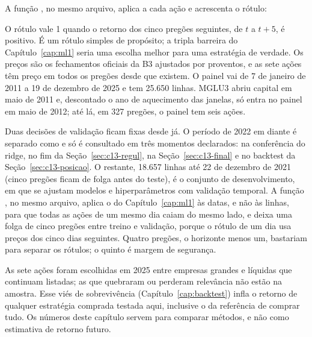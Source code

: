 A função , no mesmo arquivo, aplica  a cada ação e acrescenta o rótulo:



O rótulo  vale 1 quando o retorno dos cinco pregões seguintes, de $t$ a $t+5$, é positivo. É um rótulo simples de propósito; a tripla barreira do Capítulo~\ref{cap:ml1} seria uma escolha melhor para uma estratégia de verdade. Os preços são os fechamentos oficiais da B3 ajustados por proventos, e as sete ações têm preço em todos os pregões desde que existem. O painel vai de 7 de janeiro de 2011 a 19 de dezembro de 2025 e tem 25.650 linhas. MGLU3 abriu capital em maio de 2011 e, descontado o ano de aquecimento das janelas, só entra no painel em maio de 2012; até lá, em 327 pregões, o painel tem seis ações.

Duas decisões de validação ficam fixas desde já. O período de 2022 em diante é separado como  e só é consultado em três momentos declarados: na conferência do ridge, no fim da Seção~\ref{sec:c13-regul}, na Seção~\ref{sec:c13-final} e no backtest da Seção~\ref{sec:c13-posicao}. O restante, 18.657 linhas até 22 de dezembro de 2021 (cinco pregões ficam de folga antes do teste), é o conjunto de desenvolvimento, em que se ajustam modelos e hiperparâmetros com validação temporal. A função , no mesmo arquivo, aplica o  do Capítulo~\ref{cap:ml1} às datas, e não às linhas, para que todas as ações de um mesmo dia caiam do mesmo lado, e deixa uma folga de cinco pregões entre treino e validação, porque o rótulo de um dia usa preços dos cinco dias seguintes. Quatro pregões, o horizonte menos um, bastariam para separar os rótulos; o quinto é margem de segurança.

As sete ações foram escolhidas em 2025 entre empresas grandes e líquidas que continuam listadas; as que quebraram ou perderam relevância não estão na amostra. Esse viés de sobrevivência (Capítulo~\ref{cap:backtest}) infla o retorno de qualquer estratégia comprada testada aqui, inclusive o da referência de comprar tudo. Os números deste capítulo servem para comparar métodos, e não como estimativa de retorno futuro.


